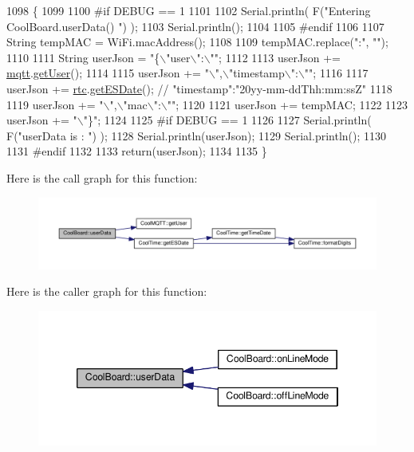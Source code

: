 \begin{DoxyCode}
1098 \{
1099 
1100 \textcolor{preprocessor}{#if DEBUG == 1}
1101 
1102     Serial.println( F(\textcolor{stringliteral}{"Entering CoolBoard.userData() "}) );
1103     Serial.println();
1104 
1105 \textcolor{preprocessor}{#endif}
1106 
1107     String tempMAC = WiFi.macAddress();
1108 
1109     tempMAC.replace(\textcolor{stringliteral}{":"}, \textcolor{stringliteral}{""});
1110 
1111     String userJson = \textcolor{stringliteral}{"\{\(\backslash\)"user\(\backslash\)":\(\backslash\)""};
1112 
1113     userJson += \hyperlink{class_cool_board_a2399f44d7c23c1149a335cb3b46d90f1}{mqtt}.\hyperlink{class_cool_m_q_t_t_a373cc92fca7760d886f02d8a6e5b3f63}{getUser}();
1114 
1115     userJson += \textcolor{stringliteral}{"\(\backslash\)",\(\backslash\)"timestamp\(\backslash\)":\(\backslash\)""};
1116 
1117     userJson += \hyperlink{class_cool_board_a50d2a6716879d64a85f3c6b44ad63275}{rtc}.\hyperlink{class_cool_time_ac4f32ee513c1328d984306645e8785a4}{getESDate}(); \textcolor{comment}{// "timestamp":"20yy-mm-ddThh:mm:ssZ"}
1118 
1119     userJson += \textcolor{stringliteral}{"\(\backslash\)",\(\backslash\)"mac\(\backslash\)":\(\backslash\)""};
1120 
1121     userJson += tempMAC;
1122 
1123     userJson += \textcolor{stringliteral}{"\(\backslash\)"\}"};
1124 
1125 \textcolor{preprocessor}{#if DEBUG == 1}
1126 
1127     Serial.println( F(\textcolor{stringliteral}{"userData is : "}) );
1128     Serial.println(userJson);
1129     Serial.println();
1130 
1131 \textcolor{preprocessor}{#endif  }
1132     
1133     \textcolor{keywordflow}{return}(userJson);
1134     
1135 \}
\end{DoxyCode}
Here is the call graph for this function\+:\nopagebreak
\begin{figure}[H]
\begin{center}
\leavevmode
\includegraphics[width=350pt]{d7/df9/class_cool_board_ae7358fb6e623cfc81b775f5f1734909b_cgraph}
\end{center}
\end{figure}
Here is the caller graph for this function\+:\nopagebreak
\begin{figure}[H]
\begin{center}
\leavevmode
\includegraphics[width=346pt]{d7/df9/class_cool_board_ae7358fb6e623cfc81b775f5f1734909b_icgraph}
\end{center}
\end{figure}



